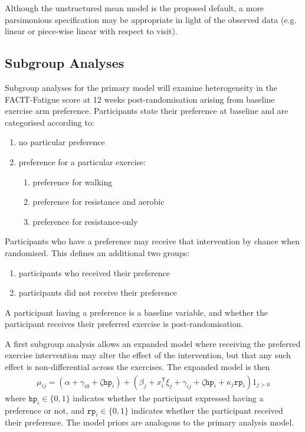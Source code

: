 \documentclass[
]{article}
\providecommand{\tightlist}{%
  \setlength{\itemsep}{0pt}\setlength{\parskip}{0pt}}
\begin{document}
Although the unstructured mean model is the proposed default, a more parsimonious specification may be appropriate in light of the observed data (e.g. linear or piece-wise linear with respect to visit).

\hypertarget{subgroup-analyses}{%
  \subsection{Subgroup Analyses}\label{subgroup-analyses}}

Subgroup analyses for the primary model will examine heterogeneity in the FACIT-Fatigue score at 12 weeks post-randomisation arising from baseline exercise arm preference.
Participants state their preference at baseline and are categorised according to:

\begin{enumerate}\tightlist
  \item no particular preference
  \item preference for a particular exercise:
        \begin{enumerate}\tightlist
          \item preference for walking
          \item preference for resistance and aerobic
          \item preference for resistance-only
        \end{enumerate}
\end{enumerate}

Participants who have a preference may receive that intervention by chance when randomised.
This defines an additional two groups:
\begin{enumerate}\tightlist
  \item participants who received their preference
  \item participants did not receive their preference
\end{enumerate}

A participant having a preference is a baseline variable, and whether the participant receives their preferred exercise is post-randomisation.

A first subgroup analysis allows an expanded model where receiving the preferred exercise intervention may alter the effect of the intervention, but that any such effect is non-differential across the exercises.
The expanded model is then
$$
\begin{aligned}
\mu_{ij} = (\alpha + \gamma_{i0} + \zeta\texttt{hp}_i) + (\beta_j + x_i^{\mathsf{T}}\xi_{j} + \gamma_{ij} + \zeta\texttt{hp}_i + \kappa_j\texttt{rp}_i)1_{j>0}
\end{aligned}
$$
where $\texttt{hp}_i\in\{0,1\}$ indicates whether the participant expressed having a preference or not, and $\texttt{rp}_i\in\{0,1\}$ indicates whether the participant received their preference.
The model priors are analogous to the primary analysis model.
\end{document}
